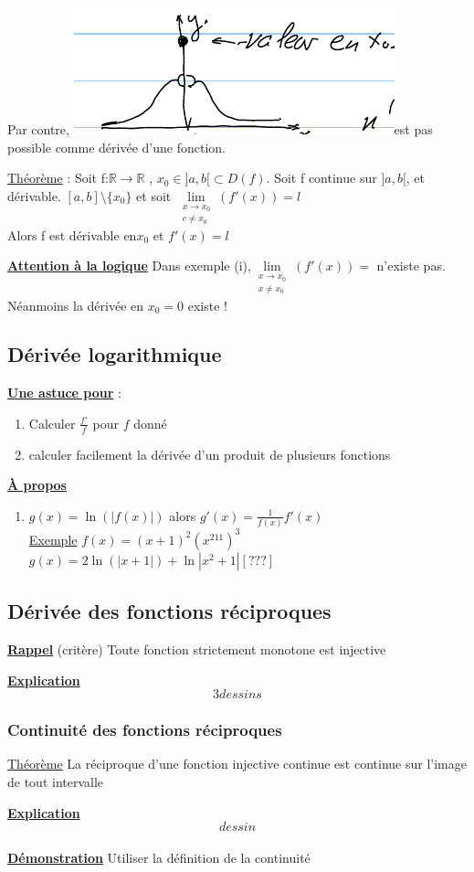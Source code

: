 \documentclass[12pt,a4paper]{article}
\newcommand{\limite}{\lim\limits_}
\newcommand{\llimite}[3]{\limite{\substack{#1 \\ #2}}\left(#3\right)}
\newcommand{\evid}[1]{\textbf{\underline{#1}}}
\newcommand{\R}{\ensuremath{\mathbb{R}} }
\newcommand{\rtor}{\ensuremath{\R \to \R} }
\newcommand{\Exemple}{\underline{Exemple} }
\newcommand{\Theoreme}{\underline{Théorème} }
\begin{document}
{Par contre, \includegraphics[scale=0.5]{illustrations_Analyse/pas_possible}est pas possible comme dérivée d'une fonction.
\begin{boite}
	\Theoreme : Soit f:\rtor, $x_0 \in ]a,b[ \subset D(f)$. Soit f continue sur $]a,b[$, et dérivable. $[a,b]\setminus\{x_0\}$ et soit $\llimite{x \to x_0}{c \neq x_0}{f'(x)} = l$\\
	Alors f est dérivable en$x_0$ et $f'(x) 
	= l$
\end{boite}
\evid{Attention à la logique} Dans exemple (i),$\llimite{x \to x_0}{x \neq x_0}{ f'(x)}=$ n'existe pas. Néanmoins la dérivée en $x_0 = 0$ existe !
\subsection{Dérivée logarithmique}
\evid{Une astuce pour} :
\begin{enumerate}[label=\roman*.]
	\item Calculer $\frac{f'}{f}$ pour $f$ donné
	\item calculer facilement la dérivée d'un produit de plusieurs fonctions	
\end{enumerate}
\evid{À propos}
\begin{enumerate}[label=\roman*.]
	\item $g(x) = \ln(|f(x)|)$ alors $g'(x) = \frac{1}{f(x)}f'(x)$\\
	\Exemple $f(x) = (x+1)^2(x^211)^3$\\
	$g(x) = 2\ln(|x+1|) + \ln|x^2+1| [???]$
\end{enumerate}
\subsection{Dérivée des fonctions réciproques}
\begin{boite}
	\evid{Rappel} (critère) Toute fonction strictement monotone est injective
\end{boite}
\evid{Explication}\\
\[3dessins\]
\subsubsection{Continuité des fonctions réciproques}
\begin{boite}
	\Theoreme La réciproque d'une fonction injective continue est continue sur l'image de tout intervalle
\end{boite}
\evid{Explication} 
\[dessin\]\\
\evid{Démonstration} Utiliser la définition de la continuité
}
\end{document}
